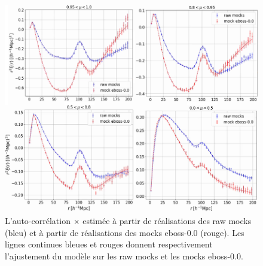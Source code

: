 \begin{figure}
  \centering
  \includegraphics[scale=0.5]{effet_dmat}
  \caption{L'auto-corrélation \lya{}$\times$\lya{} estimée à partir de \Nmocks{} réalisations des raw mocks (bleu) et à partir de \Nmocks{} réalisations des mocks eboss-0.0 (rouge). Les lignes continues bleues et rouges donnent respectivement l'ajustement du modèle sur les raw mocks et les mocks eboss-0.0.}
  \label{fig:effet_dmat}
\end{figure}

